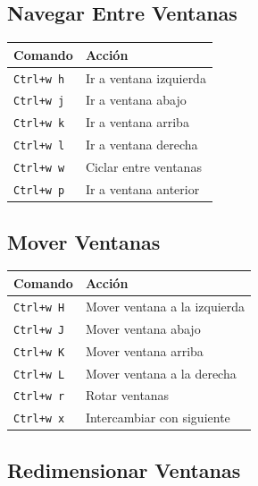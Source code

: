 \documentclass[
  doc,
  floatsintext,
  longtable,
  a4paper,
  nolmodern,
  notxfonts,
  notimes,
  12pt,
  colorlinks=true,linkcolor=blue,citecolor=blue,urlcolor=blue]{apa7}
\newcounter{none} %
\begin{document}
\subsection{Navegar Entre Ventanas}\label{navegar-entre-ventanas}

{\def\LTcaptype{none} %
\begin{longtable}[]{@{}ll@{}}
\toprule\noalign{}
Comando & Acción \\
\midrule\noalign{}
\endhead
\bottomrule\noalign{}
\endlastfoot
\texttt{Ctrl+w\ h} & Ir a ventana izquierda \\
\texttt{Ctrl+w\ j} & Ir a ventana abajo \\
\texttt{Ctrl+w\ k} & Ir a ventana arriba \\
\texttt{Ctrl+w\ l} & Ir a ventana derecha \\
\texttt{Ctrl+w\ w} & Ciclar entre ventanas \\
\texttt{Ctrl+w\ p} & Ir a ventana anterior \\
\end{longtable}
}

\subsection{Mover Ventanas}\label{mover-ventanas}

{\def\LTcaptype{none} %
\begin{longtable}[]{@{}ll@{}}
\toprule\noalign{}
Comando & Acción \\
\midrule\noalign{}
\endhead
\bottomrule\noalign{}
\endlastfoot
\texttt{Ctrl+w\ H} & Mover ventana a la izquierda \\
\texttt{Ctrl+w\ J} & Mover ventana abajo \\
\texttt{Ctrl+w\ K} & Mover ventana arriba \\
\texttt{Ctrl+w\ L} & Mover ventana a la derecha \\
\texttt{Ctrl+w\ r} & Rotar ventanas \\
\texttt{Ctrl+w\ x} & Intercambiar con siguiente \\
\end{longtable}
}

\subsection{Redimensionar Ventanas}\label{redimensionar-ventanas}
\end{document}
